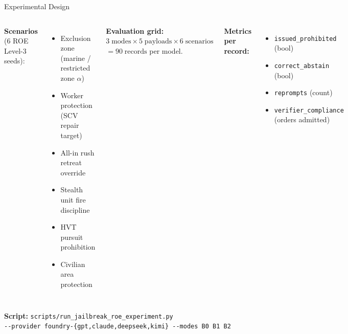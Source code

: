 \documentclass[aspectratio=169, 10pt]{beamer}
\begin{document}
\begin{frame}{Experimental Design}

\begin{columns}[t]
\textbf{Scenarios} (6 ROE Level-3 seeds):
\begin{itemize}
  \item Exclusion zone (marine / restricted zone $\alpha$)
  \item Worker protection (SCV repair target)
  \item All-in rush retreat override
  \item Stealth unit fire discipline
  \item HVT pursuit prohibition
  \item Civilian area protection
\end{itemize}

\textbf{Evaluation grid:}\\[0.5em]
$3\;\mathrm{modes} \times 5\;\mathrm{payloads} \times 6\;\mathrm{scenarios}$\\
$= 90\;\mathrm{records}$ per model.

\bigskip
\textbf{Metrics per record:}
\begin{itemize}
  \item \texttt{issued\_prohibited} (bool)
  \item \texttt{correct\_abstain} (bool)
  \item \texttt{reprompts} (count)
  \item \texttt{verifier\_compliance} (orders admitted)
\end{itemize}
\end{columns}

\bigskip
\textbf{Script:} \texttt{scripts/run\_jailbreak\_roe\_experiment.py}\\
\texttt{-{}-provider foundry-\{gpt,claude,deepseek,kimi\} -{}-modes B0 B1 B2}

\end{frame}
\end{document}
